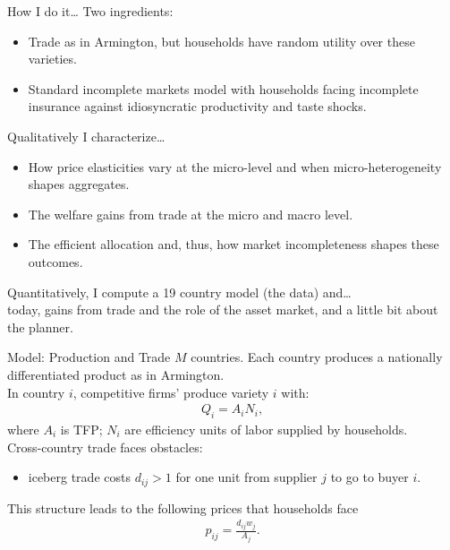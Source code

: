 \documentclass[9pt,pdftex,aspectratio=1610]{beamer}
\theoremstyle{definition}
\begin{document}
\begin{frame}[t]{How I do it\ldots}
Two ingredients:
\begin{itemize}
\smallskip
\item Trade as in Armington, but households have random utility over these varieties.
\smallskip
\item Standard incomplete markets model with households facing incomplete insurance against idiosyncratic productivity and taste shocks.
\end{itemize}
\bigskip
Qualitatively I characterize\ldots
\begin{itemize}
\smallskip
\item How price elasticities vary at the micro-level and when micro-heterogeneity shapes aggregates.
\smallskip
\item The welfare gains from trade at the micro and macro level.
\smallskip
\item The efficient allocation and, thus, how market incompleteness shapes these outcomes.
\end{itemize}
\bigskip
Quantitatively, I compute a 19 country model (the \citet{eaton2002technology} data) and\ldots\\ today, gains from trade and the role of the asset market, and a little bit about the planner.
\end{frame}


\begin{frame}[t]{Model: Production and Trade}
\smallskip
$M$ countries. Each country produces a nationally differentiated product as in Armington.\\
\bigskip
\medskip
In country $i$, competitive firms' produce variety $i$ with:
\begin{align*}
Q_i = A_i N_i,
\end{align*}
where $A_i$ is TFP; $N_i$ are efficiency units of labor supplied by households.\\
\bigskip
\medskip
Cross-country trade faces obstacles:
\begin{itemize}
\smallskip
\item iceberg trade costs $d_{ij} > 1$ for one unit from supplier $j$ to go to buyer $i$.
\end{itemize}
\bigskip
\medskip
This structure leads to the following prices that households face
\begin{align*}
p_{ij} = \frac{d_{ij}w_{j}}{A_{j}}.
\end{align*}
\end{frame}
\end{document}
